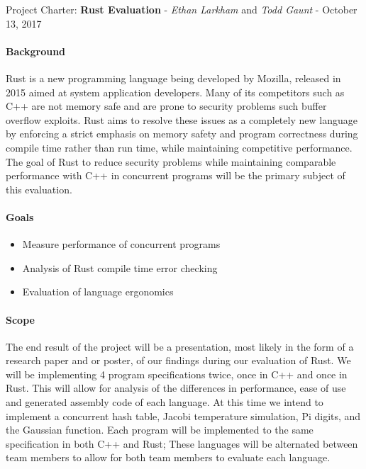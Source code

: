 \documentclass[10pt,a4paper]{report}
\begin{document}
\begin{center}
	{\Large Project Charter: {\bfseries Rust Evaluation}}
	- {\large{\itshape Ethan Larkham} and {\itshape Todd Gaunt}}
	- {\large October 13, 2017}
\end{center}
\vspace{0.5em}
\paragraph{Background}
Rust is a new programming language being developed by Mozilla, released in 2015
aimed at system application developers. Many of its competitors such as C++ are
not memory safe and are prone to security problems such buffer overflow
exploits. Rust aims to resolve these issues as a completely new language by
enforcing a strict emphasis on memory safety and program correctness during
compile time rather than run time, while maintaining competitive performance.
The goal of Rust to reduce security problems while maintaining comparable
performance with C++ in concurrent programs will be the primary subject of this
evaluation.
\paragraph{Goals}
\begin{flushleft}
	\begin{itemize}
		\item Measure performance of concurrent programs
		\item Analysis of Rust compile time error checking
		\item Evaluation of language ergonomics
	\end{itemize}
\end{flushleft}
\paragraph{Scope}
The end result of the project will be a presentation, most likely in the form
of a research paper and or poster, of our findings during our evaluation of
Rust.  We will be implementing 4 program specifications twice, once in C++ and
once in Rust. This will allow for analysis of the differences in performance,
ease of use and generated assembly code of each language. At this time we
intend to implement a concurrent hash table, Jacobi temperature simulation,  Pi
digits, and the Gaussian function. Each program will be implemented to the same
specification in both C++ and Rust; These languages will be alternated between
team members to allow for both team members to evaluate each language.
\end{document}

